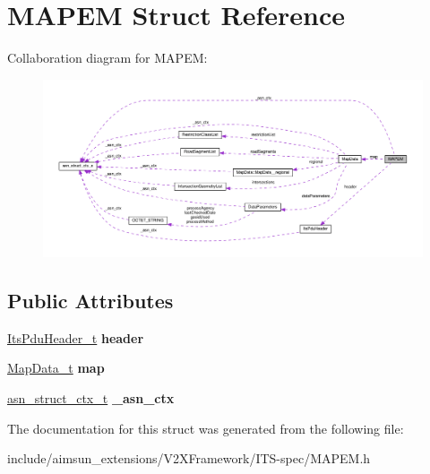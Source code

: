 \hypertarget{structMAPEM}{}\section{M\+A\+P\+EM Struct Reference}
\label{structMAPEM}


Collaboration diagram for M\+A\+P\+EM\+:\nopagebreak
\begin{figure}[H]
\begin{center}
\leavevmode
\includegraphics[width=350pt]{structMAPEM__coll__graph}
\end{center}
\end{figure}
\subsection*{Public Attributes}
\begin{DoxyCompactItemize}
\item 
\hyperlink{structItsPduHeader}{Its\+Pdu\+Header\+\_\+t} {\bfseries header}\hypertarget{structMAPEM_ad0418b7737ae822281372fed3c695348}{}\label{structMAPEM_ad0418b7737ae822281372fed3c695348}

\item 
\hyperlink{structMapData}{Map\+Data\+\_\+t} {\bfseries map}\hypertarget{structMAPEM_a22a17d2c8babc8d99627fc41b692dbcd}{}\label{structMAPEM_a22a17d2c8babc8d99627fc41b692dbcd}

\item 
\hyperlink{structasn__struct__ctx__s}{asn\+\_\+struct\+\_\+ctx\+\_\+t} {\bfseries \+\_\+asn\+\_\+ctx}\hypertarget{structMAPEM_ac891eb8705c953464583f13e1fd2f616}{}\label{structMAPEM_ac891eb8705c953464583f13e1fd2f616}

\end{DoxyCompactItemize}


The documentation for this struct was generated from the following file\+:\begin{DoxyCompactItemize}
\item 
include/aimsun\+\_\+extensions/\+V2\+X\+Framework/\+I\+T\+S-\/spec/M\+A\+P\+E\+M.\+h\end{DoxyCompactItemize}
